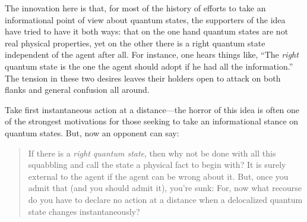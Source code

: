 The innovation here is that, for most of the history of efforts to take an informational point of view about quantum states, the supporters of the idea have tried to have it both ways:  that on the one hand quantum states are not real physical properties, yet on the other there is a right quantum state independent of the agent after all. For instance, one hears things like, ``The {\it right\/} quantum state is the one the agent should adopt if he had all the information.''  The tension in these two desires leaves their holders open to attack on both flanks and general confusion all around.

Take first instantaneous action at a distance---the horror of this idea is often one of the strongest motivations for those seeking to take an informational stance on quantum states.  But, now an opponent can say:
\begin{quotation}\small
If there is a {\it right quantum state}, then why not be done with all this squabbling and call the state a physical fact to begin with?  It is surely external to the agent if the agent can be wrong about it.  But, once you admit that (and you should admit it), you're sunk: For, now what recourse do you have to declare no action at a distance when a delocalized quantum state changes instantaneously?


\end{quotation}
